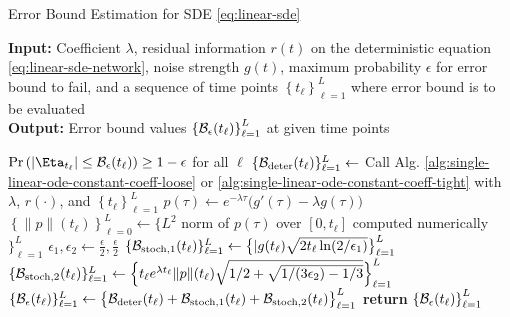     \makeatletter
    \setlength{\@fptop}{0pt}
    \begin{algorithm}[!htbp]
        \caption{Error Bound Estimation for SDE \eqref{eq:linear-sde}}\label{alg:sde}
        \textbf{Input:} Coefficient $\lambda$, residual information $r(t)$ on the deterministic equation \eqref{eq:linear-sde-network}, noise strength $g(t)$, maximum probability $\epsilon$ for error bound to fail, and a sequence of time points $\left\{t_\ell\right\}_{\ell=1}^{L}$ where error bound is to be evaluated\\
        \textbf{Output:} Error bound values $\left\{\mathcal{B}_\epsilon(t_\ell)\right\}_{\ell=1}^{L}$ at given time points
        \begin{algorithmic}
            \Ensure $\P{\left|\Eta_{t_\ell}\right| \leq \Bound_\epsilon(t_\ell)} \geq 1 - \epsilon$ for all $\ell$
            \State $\{\mathcal{B}_{\text{deter}}(t_\ell)\}_{\ell=1}^{L} \gets $ {\small Call Alg. }\ref{alg:single-linear-ode-constant-coeff-loose} {\small or }\ref{alg:single-linear-ode-constant-coeff-tight} {\small with } $\lambda${\small, }$r(\cdot)${\small, and }$\left\{t_\ell\right\}_{\ell=1}^{L}$
            \State $p(\tau) \gets e^{-\lambda\tau}\big(g'(\tau) - \lambda g(\tau)\big)$
            \State $\left\{\|p\| (t_\ell)\right\}_{\ell=0}^L \gets \{L^2$ {\small norm of} $p(\tau)$ {\small over} $[0, t_\ell]$ {\small computed numerically} $\}_{\ell=1}^{L}$
            \State $\epsilon_1, \epsilon_2 \gets \frac{\epsilon}{2}, \frac{\epsilon}{2}$ 
            \State $\{\mathcal{B}_{\text{stoch}, 1}(t_\ell)\}_{\ell=1}^{L} \gets \big\{|g(t_\ell) \sqrt{2t_\ell \ln(2/\epsilon_1)}\big\}_{\ell=1}^{L}$
            \State $\{\mathcal{B}_{\text{stoch}, 2}(t_\ell)\}_{\ell=1}^{L} \gets \Big\{t_\ell e^{\lambda t_\ell} \|p\|(t_\ell) \sqrt{1/2+ \sqrt{1/(3\epsilon_2) - 1/3}} \Big\}_{\ell=1}^{L}$
            \State $\{\mathcal{B}_{\epsilon}(t_\ell)\}_{\ell=1}^L \gets \big\{ \mathcal{B}_{\text{deter}}(t_\ell) + \mathcal{B}_{\text{stoch}, 1}(t_\ell) + \mathcal{B}_{\text{stoch}, 2}(t_\ell) \big\}_{\ell=1}^{L}$
            \State \textbf{return} $\left\{\mathcal{B}_\epsilon(t_\ell)\right\}_{\ell=1}^{L}$
        \end{algorithmic}
    \end{algorithm}
    \makeatother